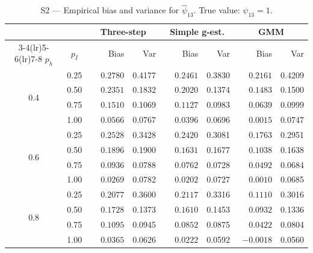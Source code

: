 \documentclass[12pt]{article}
\begin{document}
\begin{table}[htbp]
\centering
\caption{S2 --- Empirical bias and variance for $\hat\psi_{13}$.
         True value: $\psi_{13}=1$.}
\label{tab:s2_psi13}
\small
\begin{tabular}{cc rr rr rr}
\toprule
& & \multicolumn{2}{c}{Three-step} & \multicolumn{2}{c}{Simple g-est.} & \multicolumn{2}{c}{GMM} \\
\cmidrule(lr){3-4}\cmidrule(lr){5-6}\cmidrule(lr){7-8}
$p_h$ & $p_I$ & Bias & Var & Bias & Var & Bias & Var \\
\midrule
\multirow{4}{*}{0.4}
 & 0.25 & $\phantom{-}0.2780$ & 0.4177 & $\phantom{-}0.2461$ & 0.3830 & $\phantom{-}0.2161$ & 0.4209 \\
 & 0.50 & $\phantom{-}0.2351$ & 0.1832 & $\phantom{-}0.2020$ & 0.1374 & $\phantom{-}0.1483$ & 0.1500 \\
 & 0.75 & $\phantom{-}0.1510$ & 0.1069 & $\phantom{-}0.1127$ & 0.0983 & $\phantom{-}0.0639$ & 0.0999 \\
 & 1.00 & $\phantom{-}0.0566$ & 0.0767 & $\phantom{-}0.0396$ & 0.0696 & $\phantom{-}0.0015$ & 0.0747 \\
\midrule
\multirow{4}{*}{0.6}
 & 0.25 & $\phantom{-}0.2528$ & 0.3428 & $\phantom{-}0.2420$ & 0.3081 & $\phantom{-}0.1763$ & 0.2951 \\
 & 0.50 & $\phantom{-}0.1896$ & 0.1900 & $\phantom{-}0.1631$ & 0.1677 & $\phantom{-}0.1038$ & 0.1638 \\
 & 0.75 & $\phantom{-}0.0936$ & 0.0788 & $\phantom{-}0.0762$ & 0.0728 & $\phantom{-}0.0492$ & 0.0684 \\
 & 1.00 & $\phantom{-}0.0269$ & 0.0782 & $\phantom{-}0.0202$ & 0.0727 & $\phantom{-}0.0010$ & 0.0685 \\
\midrule
\multirow{4}{*}{0.8}
 & 0.25 & $\phantom{-}0.2077$ & 0.3600 & $\phantom{-}0.2117$ & 0.3316 & $\phantom{-}0.1110$ & 0.3016 \\
 & 0.50 & $\phantom{-}0.1728$ & 0.1373 & $\phantom{-}0.1610$ & 0.1453 & $\phantom{-}0.0932$ & 0.1336 \\
 & 0.75 & $\phantom{-}0.1095$ & 0.0945 & $\phantom{-}0.0852$ & 0.0875 & $\phantom{-}0.0422$ & 0.0804 \\
 & 1.00 & $\phantom{-}0.0365$ & 0.0626 & $\phantom{-}0.0222$ & 0.0592 & $-0.0018$ & 0.0560 \\
\bottomrule
\end{tabular}
\end{table}
\end{document}
